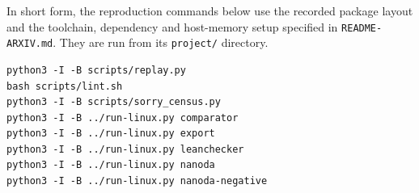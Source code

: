In short form, the reproduction commands below use the recorded package layout and the toolchain, dependency and host-memory setup specified in \texttt{README-ARXIV.md}. They are run from its \texttt{project/} directory.
\begingroup\small
\begin{verbatim}
python3 -I -B scripts/replay.py
bash scripts/lint.sh
python3 -I -B scripts/sorry_census.py
python3 -I -B ../run-linux.py comparator
python3 -I -B ../run-linux.py export
python3 -I -B ../run-linux.py leanchecker
python3 -I -B ../run-linux.py nanoda
python3 -I -B ../run-linux.py nanoda-negative
\end{verbatim}
\endgroup


